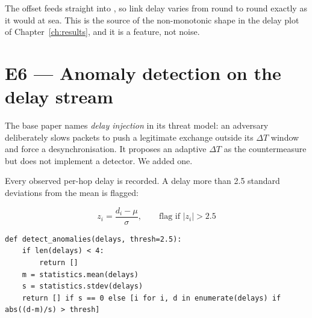 The offset feeds straight into , so link delay varies from round to
round exactly as it would at sea. This is the source of the non-monotonic shape in the delay
plot of Chapter~\ref{ch:results}, and it is a feature, not noise.

\section{E6 --- Anomaly detection on the delay stream}

The base paper names \emph{delay injection} in its threat model: an adversary deliberately
slows packets to push a legitimate exchange outside its $\Delta T$ window and force a
desynchronisation. It proposes an adaptive $\Delta T$ as the countermeasure but does not
implement a detector. We added one.

Every observed per-hop delay is recorded. A delay more than 2.5 standard deviations from the
mean is flagged:

\begin{equation}
z_i = \frac{d_i - \mu}{\sigma}, \qquad \text{flag if } |z_i| > 2.5
\end{equation}

\begin{lstlisting}[style=py,caption={$z$-score detector (lines 224--229).}]
def detect_anomalies(delays, thresh=2.5):
    if len(delays) < 4:
        return []
    m = statistics.mean(delays)
    s = statistics.stdev(delays)
    return [] if s == 0 else [i for i, d in enumerate(delays) if abs((d-m)/s) > thresh]
\end{lstlisting}

